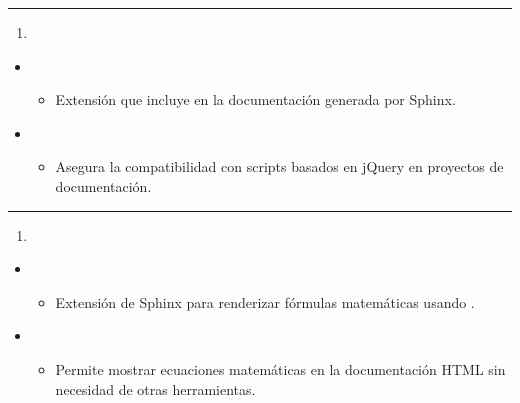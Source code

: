 \documentclass[a4paper,10pt,spanish]{sphinxmanual}
\begin{document}
\bigskip\hrule\bigskip

\begin{enumerate}
%
\setcounter{enumi}{34}
\item {} 
\sphinxAtStartPar
{}

\end{enumerate}
\begin{itemize}
\item {} 
\sphinxAtStartPar
{}
\begin{itemize}
\item {} 
\sphinxAtStartPar
Extensión que incluye  en la documentación generada por Sphinx.

\end{itemize}

\item {} 
\sphinxAtStartPar
{}
\begin{itemize}
\item {} 
\sphinxAtStartPar
Asegura la compatibilidad con scripts basados en jQuery en proyectos de documentación.

\end{itemize}

\end{itemize}


\bigskip\hrule\bigskip

\begin{enumerate}
%
\setcounter{enumi}{35}
\item {} 
\sphinxAtStartPar
{}

\end{enumerate}
\begin{itemize}
\item {} 
\sphinxAtStartPar
{}
\begin{itemize}
\item {} 
\sphinxAtStartPar
Extensión de Sphinx para renderizar fórmulas matemáticas usando .

\end{itemize}

\item {} 
\sphinxAtStartPar
{}
\begin{itemize}
\item {} 
\sphinxAtStartPar
Permite mostrar ecuaciones matemáticas en la documentación HTML sin necesidad de otras herramientas.

\end{itemize}

\end{itemize}
\end{document}
